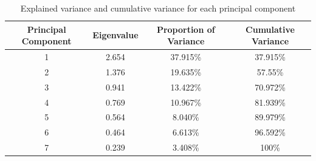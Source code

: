 \documentclass[12pt,twoside]{article}
\newcommand{\head}[1]{\textnormal{\textbf{#1}}}
\begin{document}
\begin{table}[H]
\begin{tabular}{cccc}
\hline
\head{Principal Component} & \head{Eigenvalue} & \head{Proportion of Variance} & \head{Cumulative Variance}\\
\hline
1 & 2.654 &  37.915\% & 37.915\%\\
2 & 1.376 & 19.635\% & 57.55\%\\
3 & 0.941 &  13.422\% & 70.972\%\\
4 & 0.769 &  10.967\% & 81.939\%\\
5 & 0.564 &  8.040\%  & 89.979\%\\
6 & 0.464 & 6.613\% & 96.592\%\\
7 & 0.239 &  3.408\% & 100\%\\
\hline
\end{tabular}
\caption{Explained variance and cumulative variance for each principal component}
\end{table}
\end{document}
